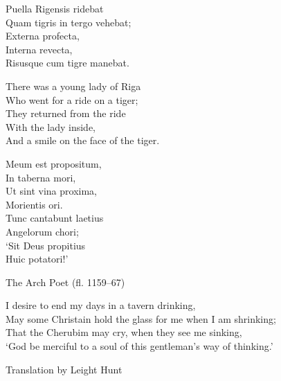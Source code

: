 \documentclass[10pt,a4paper,oneside,extrafontsizes]{memoir}%
\begin{document}
\begin{minipage}[t]{0.45\textwidth}
Puella Rigensis ridebat \\
Quam tigris in tergo vehebat; \\
\hspace*{2em}Externa profecta,\\ 
\hspace*{2em}Interna revecta,\\ 
Risusque cum tigre manebat.
\end{minipage}
\hfill
\begin{minipage}[t]{0.45\textwidth}
There was a young lady of Riga \\
Who went for a ride on a tiger; \\
\hspace*{2em}They returned from the ride \\
\hspace*{2em}With the lady inside, \\
And a smile on the face of the tiger.
\end{minipage}
\vspace{\onelineskip}

\begin{minipage}[t]{0.45\textwidth}
Meum est propositum,\\  
In taberna mori,\\ 
Ut sint vina proxima,\\ 
Morientis ori.\\ 
Tunc cantabunt laetius\\ 
Angelorum chori;\\ 
`Sit Deus propitius\\ 
Huic potatori!' \par
{\raggedleft\footnotesize  The Arch Poet (fl. 1159--67)\par}
\end{minipage}
\hfill
\begin{minipage}[t]{0.45\textwidth}
I desire to end my days in a tavern drinking, \\
May some Christain hold the glass for me when I am shrinking; \\
That the Cherubim may cry, when they see me sinking, \\
`God be merciful to a soul of this gentleman's way of thinking.' \par
{\raggedleft\footnotesize Translation by Leight Hunt\par}
\end{minipage}
\vspace{\onelineskip}
\end{document}

